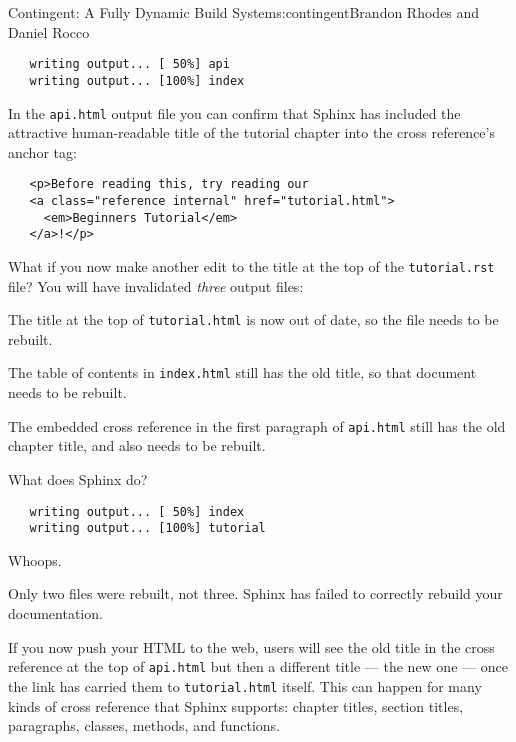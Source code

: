 \begin{aosachapter}{Contingent: A Fully Dynamic Build System}{s:contingent}{Brandon Rhodes and Daniel Rocco}
\begin{verbatim}
   writing output... [ 50%] api
   writing output... [100%] index
\end{verbatim}

In the \texttt{api.html} output file you can confirm that Sphinx has
included the attractive human-readable title of the tutorial chapter
into the cross reference's anchor tag:

\begin{verbatim}
   <p>Before reading this, try reading our
   <a class="reference internal" href="tutorial.html">
     <em>Beginners Tutorial</em>
   </a>!</p>
\end{verbatim}

What if you now make another edit to the title at the top of the
\texttt{tutorial.rst} file? You will have invalidated \emph{three}
output files:

\begin{aosaenumerate}
\def\labelenumi{\arabic{enumi}.}
\item
  The title at the top of \texttt{tutorial.html} is now out of date, so
  the file needs to be rebuilt.
\item
  The table of contents in \texttt{index.html} still has the old title,
  so that document needs to be rebuilt.
\item
  The embedded cross reference in the first paragraph of
  \texttt{api.html} still has the old chapter title, and also needs to
  be rebuilt.
\end{aosaenumerate}

What does Sphinx do?

\begin{verbatim}
   writing output... [ 50%] index
   writing output... [100%] tutorial
\end{verbatim}

Whoops.

Only two files were rebuilt, not three. Sphinx has failed to correctly
rebuild your documentation.

If you now push your HTML to the web, users will see the old title in
the cross reference at the top of \texttt{api.html} but then a different
title --- the new one --- once the link has carried them to
\texttt{tutorial.html} itself. This can happen for many kinds of cross
reference that Sphinx supports: chapter titles, section titles,
paragraphs, classes, methods, and functions.

\label{build-systems-and-consistency}


\end{aosachapter}
